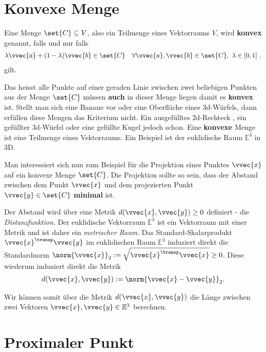 \documentclass[
  12pt,
  british,
  a4paper,
  twoside,
  titlepage,
  openright,
  numbers=noenddot,
  chapterprefix=true,
  headings=optiontohead,
  svgnames,
  dvipsnames]{scrreprt}
\begin{document}
\hypertarget{konvexe-menge}{%
\section{Konvexe Menge}\label{konvexe-menge}}

Eine Menge \(\set{C} \subseteq V\), also ein Teilmenge eines Vektorraums
\(V\), wird \textbf{konvex} genannt, falls und nur falls \begin{align}
\lambda \vvec{a} + (1-\lambda) \vvec{b} \in \set{C} \quad \forall \vvec{a},\vvec{b} \in \set{C}, \ \lambda \in [0,1] \ .
\end{align} gilt.

Das heisst alle Punkte auf einer geraden Linie zwischen zwei beliebigen
Punkten aus der Menge \(\set{C}\) müssen \textbf{auch} in dieser Menge
liegen damit es \textbf{konvex} ist. Stellt man sich eine Banane vor
oder eine Oberfläche eines \(3\)d-Würfels, dann erfüllen diese Mengen
das Kriterium nicht. Ein ausgefülltes \(2\)d-Rechteck , ein gefüllter
\(3\)d-Würfel oder eine gefüllte Kugel jedoch schon. Eine
\textbf{konvexe} Menge ist eine Teilmenge eines Vektorraums. Ein
Beispiel ist der euklidische Raum \(\mathbb{E}^3\) in \(3\)D.

Man interessiert sich nun zum Beispiel für die Projektion eines Punktes
\(\vvec{x}\) auf ein konvexe Menge \(\set{C}\). Die Projektion sollte so
sein, dass der Abstand zwischen dem Punkt \(\vvec{x}\) und dem
projezierten Punkt \(\vvec{y} \in \set{C}\) \textbf{minimal} ist.

Der Abstand wird über eine Metrik \(d(\vvec{x},\vvec{y}) \geq 0\)
definiert - die \emph{Distanzfunktion}. Der euklidische Vektorraum
\(\mathbb{E}^3\) ist ein Vektorraum mit einer Metrik und ist daher ein
\emph{metrischer Raum}. Das Standard-Skalarprodukt
\(\vvec{x}^\transp \vvec{y}\) im euklidischen Raum \(\mathbb{E}^3\)
induziert direkt die Standardnorm
\(\norm{\vvec{x}}_2 := \sqrt{\vvec{x}^\transp \vvec{x}} \geq 0\). Diese
wiederum induziert direkt die Metrik \begin{align}
d(\vvec{x},\vvec{y}) := \norm{\vvec{x} - \vvec{y}}_2.
\end{align}

Wir können somit über die Metrik \(d(\vvec{x},\vvec{y})\) die Länge
zwischen zwei Vektoren \(\vvec{x},\vvec{y} \in \mathbb{E}^3\) berechnen.

\hypertarget{proximaler-punkt}{%
\section{Proximaler Punkt}\label{proximaler-punkt}}
\end{document}

